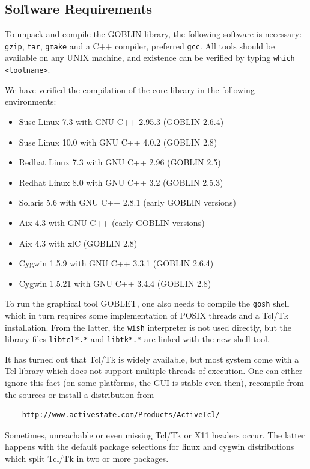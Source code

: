 \documentclass[a4paper,11pt,twoside]{book}
\begin{document}
\begin{multicols}{2}
\section{Software Requirements}

To unpack and compile the GOBLIN library, the following software is necessary:
\verb/gzip/, \verb/tar/, \verb/gmake/ and a C++ compiler, preferred \verb/gcc/.
All tools should be available on any UNIX machine, and existence can be verified
by typing \verb/which <toolname>/.

We have verified the compilation of the core library in the following environments:
\begin{itemize}
\item Suse Linux 7.3 with GNU C++ 2.95.3 (GOBLIN 2.6.4)
\item Suse Linux 10.0 with GNU C++ 4.0.2 (GOBLIN 2.8)
\item Redhat Linux 7.3 with GNU C++ 2.96 (GOBLIN 2.5)
\item Redhat Linux 8.0 with GNU C++ 3.2 (GOBLIN 2.5.3)
\item Solaris 5.6 with GNU C++ 2.8.1 (early GOBLIN versions)
\item Aix 4.3 with GNU C++ (early GOBLIN versions)
\item Aix 4.3 with xlC (GOBLIN 2.8)
\item Cygwin 1.5.9 with GNU C++ 3.3.1 (GOBLIN 2.6.4)
\item Cygwin 1.5.21 with GNU C++ 3.4.4 (GOBLIN 2.8)
\end{itemize}
To run the graphical tool GOBLET, one also needs to compile the \verb/gosh/
shell which in turn requires some implementation of POSIX threads and a Tcl/Tk
installation. From the latter, the \verb/wish/ interpreter is not used directly,
but the library files \verb/libtcl*.*/ and \verb/libtk*.*/ are linked with the
new shell tool.

It has turned out that Tcl/Tk is widely available, but most system come with
a Tcl library which does not support multiple threads of execution. One can
either ignore this fact (on some platforms, the GUI is stable even then),
recompile from the sources or install a distribution from
\begin{verbatim}
    http://www.activestate.com/Products/ActiveTcl/
\end{verbatim}
Sometimes, unreachable or even missing Tcl/Tk or X11 headers occur. The
latter happens with the default package selections for linux and cygwin
distributions which split Tcl/Tk in two or more packages.


\end{multicols}
\end{document}
